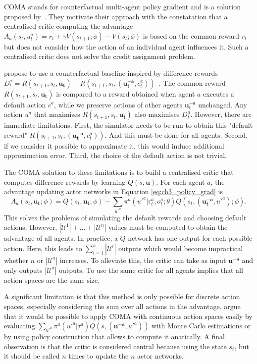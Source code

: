 COMA stands for counterfactual multi-agent policy gradient and is a solution proposed by~\cite{foerster2017coma}.
They motivate their approach with the constatation that a centralised critic computing the advantage $A_a(s_t, u^a_t) = r_t + \gamma V(s_{t+1}; \phi) - V(s_t; \phi)$ is based on the common reward $r_t$ but does not consider how the action of an individual agent influences it.
Such a centralised critic does not solve the credit assignment problem.

\cite{foerster2017coma} propose to use a counterfactual baseline inspired by difference rewards $D_t^a=R(s_{t+1}, s_t, \mathbf{u_t}) - R(s_{t+1}, s_t, (\mathbf{u_t^{-a}}, c_t^a))$~\citep{wolpert2001optimal}.
The common reward $R(s_{t+1}, s_t, \mathbf{u_t})$ is compared to a reward obtained when agent $a$ executes a default action $c^a$, while we preserve actions of other agents $\mathbf{u_t^{-a}}$ unchanged.
Any action $u^a$ that maximises $R(s_{t+1}, s_t, \mathbf{u_t})$ also maximises $D_t^a$.
However, there are immediate limitations.
First, the simulator needs to be run to obtain this "default reward" $R(s_{t+1}, s_t, (\mathbf{u_t^{-a}}, c_t^a))$.
And this must be done for all agents.
Second, if we consider it possible to approximate it, this would induce additional approximation error.
Third, the choice of the default action is not trivial.

The COMA solution to these limitations is to build a centralised critic that computes difference rewards by learning $Q(s, \mathbf{u})$.
For each agent $a$, the advantage updating actor networks in Equation \ref{eq:ch3_policy_grad} is 
\begin{equation}
\label{eq:ch3_coma_adv}
A_a(s_t,\mathbf{u_t}; \phi)=Q(s_t, \mathbf{u_t};\phi) - \sum_{u'^{a}} \pi^a({u'^{a}} |\tau_t^a, o_t^a;\theta) Q(s_t, (\mathbf{u_t^{-a}}, u'^{a}); \phi).
\end{equation}
This solves the problems of simulating the default rewards and choosing default actions.
However, $|\mathcal{U}^1|+...+|\mathcal{U}^n|$ values must be computed to obtain the advantage of all agents.
In practice, a $Q$ network has one output for each possible action.
Here, this leads to $\sum_{i=1}^n|\mathcal{U}^i|$ outputs which would become impractical whether $n$ or $|\mathcal{U}^a|$ increases.
To alleviate this, the critic can take as input $\mathbf{u^{-a}}$ and only outputs $|\mathcal{U}^a|$ outputs.
To use the same critic for all agents implies that all action spaces are the same size.

A significant limitation is that this method is only possible for discrete action spaces, especially considering the sum over all actions in the advantage.
\cite{foerster2017coma} argue that it would be possible to apply COMA with continuous action spaces easily by evaluating $\sum_{u'^{a}} \pi^a(u'^{a}|\tau^a) Q(s,(\mathbf{u^{-a}},u'^{a}))$ with Monte Carlo estimations or by using policy construction that allows to compute it anatically.
A final observation is that the critic is considered central because using the state $s_t$, but it should be called $n$ times to update the $n$ actor networks.

